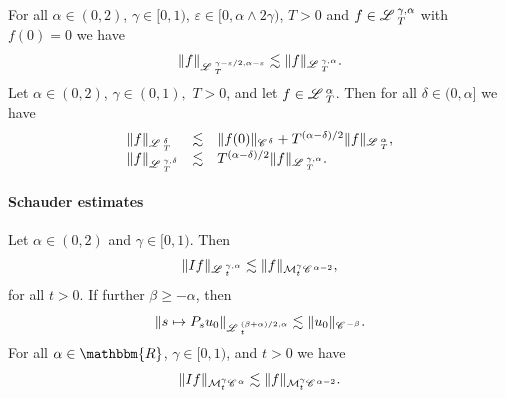 \begin{appendices}
\begin{lemma}
  \label{l:L-interpol}For all $\alpha \in (0, 2)$, $\gamma \in [0, 1)$,
  $\varepsilon \in [0, \alpha \wedge 2 \gamma)$, $T > 0$ and $f \in
  \mathscr{L} \hspace{.2em}^{\gamma, \alpha}_T$ with $f (0) = 0$ we have
  \begin{equation}
    \label{eq:schauder time reg} \| f \|_{\mathscr{L} \hspace{.2em}^{\gamma - \varepsilon / 2,
    \alpha - \varepsilon}_T} \lesssim \| f \|_{\mathscr{L} \hspace{.2em}^{\gamma, \alpha}_T} .
  \end{equation}
  Let $\alpha \in (0, 2)$, $\gamma \in (0, 1),$ $T > 0$, and let $f \in
  \mathscr{L} \hspace{.2em}^{\alpha}_T$. Then for all $\delta \in (0, \alpha]$ we have
  \begin{equation}
    \begin{array}{lll}
      \| f \|_{\mathscr{L} \hspace{.2em}^{\delta}_T} & \lesssim & \| f (0) \|_{\mathscr{C} \hspace{.1em}^{\delta}} +
      T^{(\alpha - \delta) / 2} \| f \|_{\mathscr{L} \hspace{.2em}^{\alpha}_T},\\
      \| f \|_{\mathscr{L} \hspace{.2em}^{\gamma, \delta}_T} & \lesssim & T^{(\alpha - \delta) / 2}
      \| f \|_{\mathscr{L} \hspace{.2em}^{\gamma, \alpha}_T} .
    \end{array} \label{eq:schauder-gain-time}
  \end{equation}
\end{lemma}

\paragraph{Schauder estimates}

\begin{lemma}
  \label{lemma:schauder}Let $\alpha \in (0, 2)$ and $\gamma \in [0, 1)$. Then
  \begin{equation}
    \label{eq:schauder-heat} \|I f\|_{\mathscr{L} \hspace{.2em}^{\gamma, \alpha}_t} \lesssim \| f
    \|_{\mathcal{M}^{\gamma}_t \mathscr{C} \hspace{.1em}^{\alpha - 2}},
  \end{equation}
  for all $t > 0$. If further $\beta \geqslant - \alpha$, then
  \begin{equation}
    \label{eq:schauder initial contribution} \| s \mapsto P_s u_0
    \|_{\mathscr{L} \hspace{.2em}^{(\beta + \alpha) / 2, \alpha}_t} \lesssim \| u_0 \|_{\mathscr{C} \hspace{.1em}^{-
    \beta}} .
  \end{equation}
  For all $\alpha \in \mathbbm{R}$, $\gamma \in [0, 1)$, and $t > 0$ we have
  \begin{equation}
    \label{eq:schauder without time hoelder} \|I f\|_{\mathcal{M}^{\gamma}_t
    \mathscr{C} \hspace{.1em}^{\alpha}} \lesssim \| f \|_{\mathcal{M}^{\gamma}_t \mathscr{C} \hspace{.1em}^{\alpha - 2}} .
  \end{equation}
\end{lemma}


\end{appendices}
